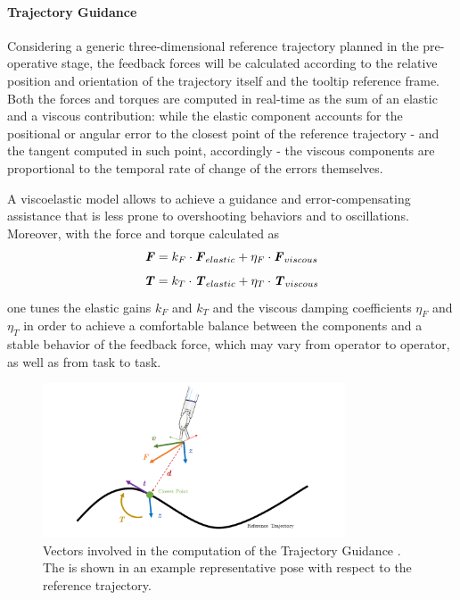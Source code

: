 \documentclass[../main.tex]{subfiles}
\begin{document}
\paragraph{Trajectory Guidance} 
Considering a generic three-dimensional reference trajectory planned in the pre-operative stage, the feedback forces will be calculated according to the relative position and orientation of the trajectory itself and the tooltip reference frame. Both the forces and torques are computed in real-time as the sum of an elastic and a viscous contribution: while the elastic component accounts for the positional or angular error to the closest point of the reference trajectory - and the tangent computed in such point, accordingly - the viscous components are proportional to the temporal rate of change of the errors themselves. 

A viscoelastic model allows to achieve a guidance and error-compensating assistance that is less prone to overshooting behaviors and to oscillations. Moreover, with the force and torque calculated as 
\begin{equation}
    \textbf{\textit{F}} = k_F\cdot\textbf{\textit{F}}_{elastic} + \eta_F\cdot\textbf{\textit{F}}_{viscous} 
    \label{eq:force}
\end{equation}
\begin{equation}
    \textbf{\textit{T}} = k_T\cdot\textbf{\textit{T}}_{elastic} + \eta_T\cdot\textbf{\textit{T}}_{viscous}
    \label{eq:torque}
\end{equation}
one tunes the elastic gains $k_F$ and $k_T$ and the viscous damping coefficients $\eta_F$ and $\eta_T$ in order to achieve a comfortable balance between the components and a stable behavior of the feedback force, which may vary from operator to operator, as well as from task to task.

\begin{figure}
    \centering
    \includegraphics[width=0.8\textwidth]{images/trajectory_guidance.png}
    \caption{Vectors involved in the computation of the Trajectory Guidance \vf. The \psm is shown in an example representative pose with respect to the reference trajectory.}
    \label{fig:trajectoryguidance}
\end{figure}
\end{document}
